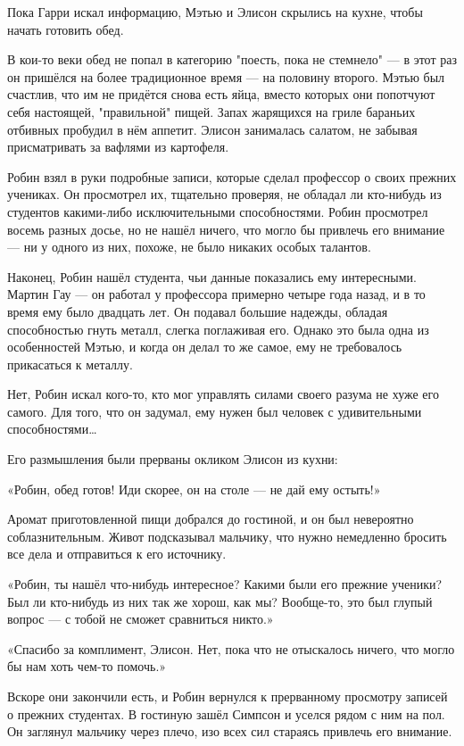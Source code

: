 \documentclass[a5paper, 9pt,
final, openany, twoside=true]{memoir}
\begin{document}
Пока Гарри искал информацию, Мэтью и Элисон скрылись на кухне, чтобы начать готовить обед.

В кои-то веки обед не попал в категорию "поесть, пока не стемнело" — в этот раз он пришёлся на более традиционное время — на половину второго. Мэтью был счастлив, что им не придётся снова есть яйца, вместо которых они попотчуют себя настоящей, "правильной" пищей. Запах жарящихся на гриле бараньих отбивных пробудил в нём аппетит. Элисон занималась салатом, не забывая присматривать за вафлями из картофеля.\bigskip

Робин взял в руки подробные записи, которые сделал профессор о своих прежних учениках. Он просмотрел их, тщательно проверяя, не обладал ли кто-нибудь из студентов какими-либо исключительными способностями. Робин просмотрел восемь разных досье, но не нашёл ничего, что могло бы привлечь его внимание — ни у одного из них, похоже, не было никаких особых талантов.

Наконец, Робин нашёл студента, чьи данные показались ему интересными. Мартин Гау — он работал у профессора примерно четыре года назад, и в то время ему было двадцать лет. Он подавал большие надежды, обладая способностью гнуть металл, слегка поглаживая его. Однако это была одна из особенностей Мэтью, и когда он делал то же самое, ему не требовалось прикасаться к металлу.

Нет, Робин искал кого-то, кто мог управлять силами своего разума не хуже его самого. Для того, что он задумал, ему нужен был человек с удивительными способностями…

Его размышления были прерваны окликом Элисон из кухни:

«Робин, обед готов! Иди скорее, он на столе — не дай ему остыть!»

Аромат приготовленной пищи добрался до гостиной, и он был невероятно соблазнительным. Живот подсказывал мальчику, что нужно немедленно бросить все дела и отправиться к его источнику.\bigskip

«Робин, ты нашёл что-нибудь интересное? Какими были его прежние ученики? Был ли кто-нибудь из них так же хорош, как мы? Вообще-то, это был глупый вопрос — с тобой не сможет сравниться никто.»

«Спасибо за комплимент, Элисон. Нет, пока что не отыскалось ничего, что могло бы нам хоть чем-то помочь.»\bigskip

Вскоре они закончили есть, и Робин вернулся к прерванному просмотру записей о прежних студентах. В гостиную зашёл Симпсон и уселся рядом с ним на пол. Он заглянул мальчику через плечо, изо всех сил стараясь привлечь его внимание.
\end{document}
